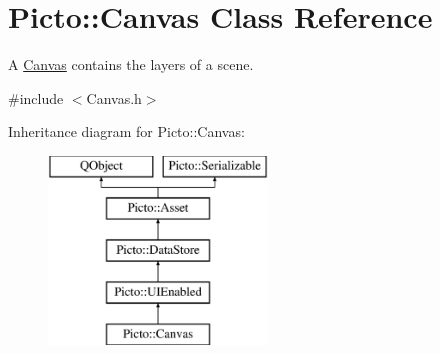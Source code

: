 \hypertarget{class_picto_1_1_canvas}{\section{Picto\-:\-:Canvas Class Reference}
\label{class_picto_1_1_canvas}
}


A \hyperlink{class_picto_1_1_canvas}{Canvas} contains the layers of a scene.  




{\ttfamily \#include $<$Canvas.\-h$>$}

Inheritance diagram for Picto\-:\-:Canvas\-:\begin{figure}[H]
\begin{center}
\leavevmode
\includegraphics[height=5.000000cm]{class_picto_1_1_canvas}
\end{center}
\end{figure}
